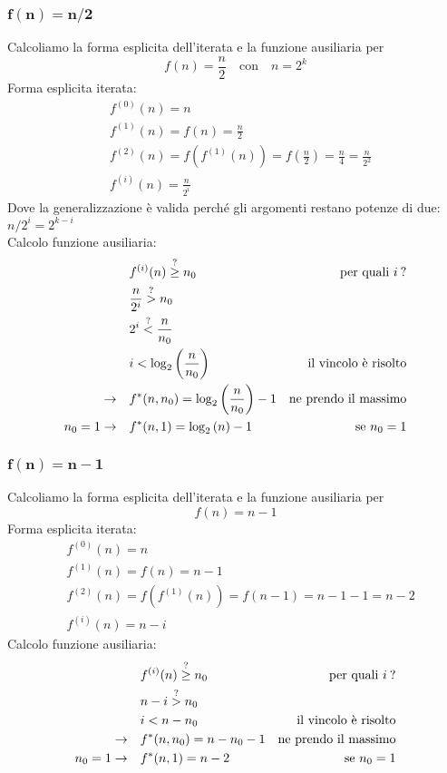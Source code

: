 \subsubsection{$\bm{f(n) = n/2}$}
Calcoliamo la forma esplicita dell'iterata e la funzione ausiliaria per
\[ f(n) = \frac{n}{2} \quad \text{con} \quad n=2^k \]
Forma esplicita iterata:
\begin{align*}
    & f^{(0)}(n) = n \\
    & f^{(1)}(n) = f(n) = \frac{n}{2} \\
    & f^{(2)}(n) = f \left( f^{(1)}(n) \right) = f \left( \frac{n}{2} \right) = \frac{n}{4} = \frac{n}{2^2} \\
    & f^{(i)}(n) = \frac{n}{2^i} 
\end{align*}
Dove la generalizzazione  è valida perché gli argomenti restano potenze di due: $n/2^i = 2^{k-i}$ \\
Calcolo funzione ausiliaria:
\begin{align*}
    & f^{(i)}(n) \overset{?}{\geq} n_0 
        & \text{per quali $i\:$?}\\
    & \frac{n}{2^i} \overset{?}{>} n_0 \\
    & 2^i \overset{?}{<} \frac{n}{n_0} \\
    & i < \log_2 \left( \frac{n}{n_0} \right)
        & \text{il vincolo è risolto} \\
    \rightarrow \quad & f^*(n, n_0) = \log_2 \left( \frac{n}{n_0} \right) - 1
        & \text{ne prendo il massimo} \\
    n_0 = 1 \rightarrow \quad & f^*(n, 1) = \log_2 \left( n \right) - 1
        & \text{se $n_0=1$}
\end{align*}

\subsubsection{$\bm{f(n) = n-1}$}
Calcoliamo la forma esplicita dell'iterata e la funzione ausiliaria per
\[ f(n) = n-1 \]
Forma esplicita iterata:
\begin{align*}
    & f^{(0)}(n) = n \\
    & f^{(1)}(n) = f(n) = n-1 \\
    & f^{(2)}(n) = f \left( f^{(1)}(n) \right) = f \left( n-1 \right) = n-1-1 = n-2 \\
    & f^{(i)}(n) = n-i
\end{align*}
Calcolo funzione ausiliaria:
\begin{align*}
    & f^{(i)}(n) \overset{?}{\geq} n_0 
        & \text{per quali $i\:$?}\\
    & n-i \overset{?}{>} n_0 \\
    & i < n - n_0
        & \text{il vincolo è risolto} \\
    \rightarrow \quad & f^*(n, n_0) = n - n_0 - 1
        & \text{ne prendo il massimo} \\
    n_0 = 1 \rightarrow \quad & f^*(n, 1) = n - 2
        & \text{se $n_0=1$}
\end{align*}

